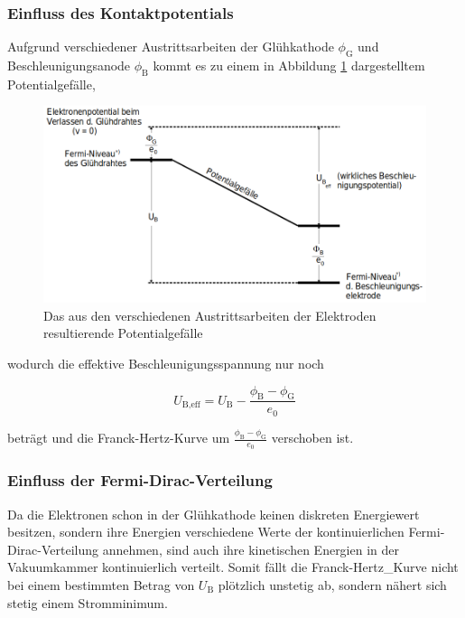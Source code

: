 \subsubsection{Einfluss des Kontaktpotentials}

Aufgrund verschiedener Austrittsarbeiten der Glühkathode $\phi_\text{G}$ und Beschleunigungsanode
$\phi_\text{B}$ kommt es zu einem in Abbildung \ref{fig:bild3} dargestelltem Potentialgefälle,

\begin{figure} [H]
    \centering
    \includegraphics{content/bild3.png}
    \caption{Das aus den verschiedenen Austrittsarbeiten der Elektroden resultierende Potentialgefälle}
    \label{fig:bild3}
  \end{figure}

wodurch die effektive Beschleunigungsspannung nur noch

\begin{equation}
    U_\text{B,eff} = U_\text{B} - \frac{\phi_\text{B} - \phi_\text{G}}{e_0}
\end{equation}

beträgt und die Franck-Hertz-Kurve um $\frac{\phi_\text{B} - \phi_\text{G}}{e_0}$ verschoben ist.

\subsubsection{Einfluss der Fermi-Dirac-Verteilung}

Da die Elektronen schon in der Glühkathode keinen diskreten Energiewert besitzen, sondern
ihre Energien verschiedene Werte der kontinuierlichen Fermi-Dirac-Verteilung annehmen,
sind auch ihre kinetischen Energien in der Vakuumkammer kontinuierlich verteilt.
Somit fällt die Franck-Hertz_Kurve nicht bei einem bestimmten Betrag von $U_\text{B}$ plötzlich
unstetig ab, sondern nähert sich stetig einem Stromminimum.

